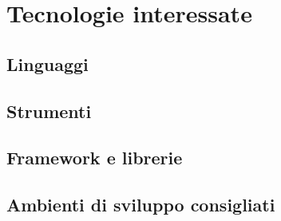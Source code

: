 \section{Tecnologie interessate}
	\subsection{Linguaggi}
	\subsection{Strumenti}
	\subsection{Framework e librerie}
	\subsection{Ambienti di sviluppo consigliati}